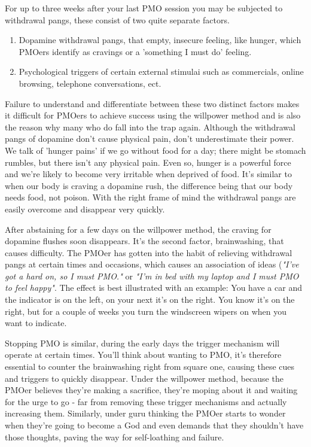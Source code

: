 \documentclass[easypeasy.tex]{subfiles}
\begin{document}
For up to three weeks after your last PMO session you may be subjected to withdrawal pangs, these consist of two quite separate factors.
\begin{enumerate}
  \item Dopamine withdrawal pangs, that empty, insecure feeling, like hunger, which PMOers identify as cravings or a 'something I must do' feeling.

  \item Psychological triggers of certain external stimulai such as commercials, online browsing, telephone conversations, ect.
\end{enumerate}

Failure to understand and differentiate between these two distinct factors makes it difficult for PMOers to achieve success using the willpower method and is also the reason why many who do fall into the trap again. Although the withdrawal pangs of dopamine don't cause physical pain, don't underestimate their power. We talk of 'hunger pains' if we go without food for a day; there might be stomach rumbles, but there isn't any physical pain. Even so, hunger is a powerful force and we're likely to become very irritable when deprived of food. It's similar to when our body is craving a dopamine rush, the difference being that our body needs food, not poison. With the right frame of mind the withdrawal pangs are easily overcome and disappear very quickly.

After abstaining for a few days on the willpower method, the craving for dopamine flushes soon disappears. It's the second factor, brainwashing, that causes difficulty. The PMOer has gotten into the habit of relieving withdrawal pangs at certain times and occasions, which causes an association of ideas (\textit{"I've got a hard on, so I must PMO."} or \textit{"I'm in bed with my laptop and I must PMO to feel happy"}. The effect is best illustrated with an example: You have a car and the indicator is on the left, on your next it's on the right. You know it's on the right, but for a couple of weeks you turn the windscreen wipers on when you want to indicate.

Stopping PMO is similar, during the early days the trigger mechanism will operate at certain times. You'll think about wanting to PMO, it's therefore essential to counter the brainwashing right from square one, causing these cues and triggers to quickly disappear. Under the willpower method, because the PMOer believes they're making a sacrifice, they're moping about it and waiting for the urge to go - far from removing these trigger mechanisms and actually increasing them. Similarly, under guru thinking the PMOer starts to wonder when they're going to become a God and even demands that they shouldn't have those thoughts, paving the way for self-loathing and failure.
\end{document}
